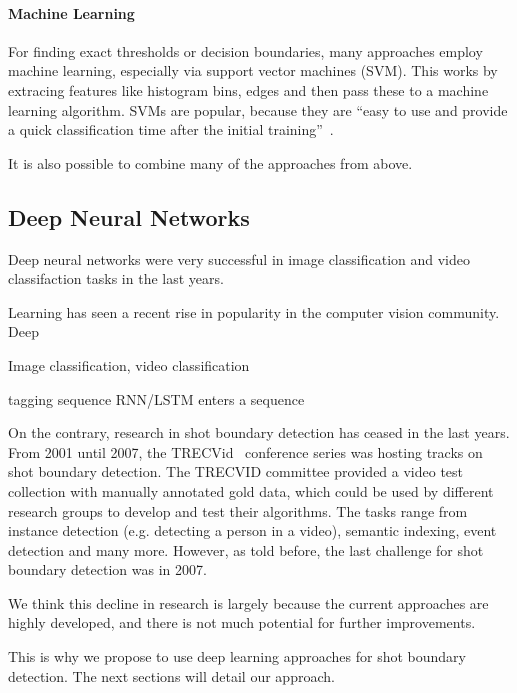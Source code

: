 \paragraph{Machine Learning}
For finding exact thresholds or decision boundaries, many approaches employ machine learning, especially via support vector machines (SVM).
This works by extracing features like histogram bins, edges and then pass these to a machine learning algorithm.
SVMs are popular, because they are ``easy to use and provide a quick classification time after the initial training''~\cite{smeaton2010video}.

It is also possible to combine many of the approaches from above.




\subsection{Deep Neural Networks}
Deep neural networks were very successful in image classification and video classifaction tasks in the last years.

Learning has seen a recent rise in popularity in the computer vision community.
Deep

Image classification, video classification

tagging sequence
RNN/LSTM
enters a sequence


On the contrary, research in shot boundary detection has ceased in the last years.
From 2001 until 2007, the TRECVid~\cite{trecvid} conference series was hosting tracks on shot boundary detection.
The TRECVID committee provided a video test collection with manually annotated gold data, which could be used by different research groups to develop and test their algorithms.
The tasks range from instance detection (e.g. detecting a person in a video), semantic indexing, event detection and many more.
However, as told before, the last challenge for shot boundary detection was in 2007.

We think this decline in research is largely because the current approaches are highly developed, and there is not much potential for further improvements.

This is why we propose to use deep learning approaches for shot boundary detection.
The next sections will detail our approach.

